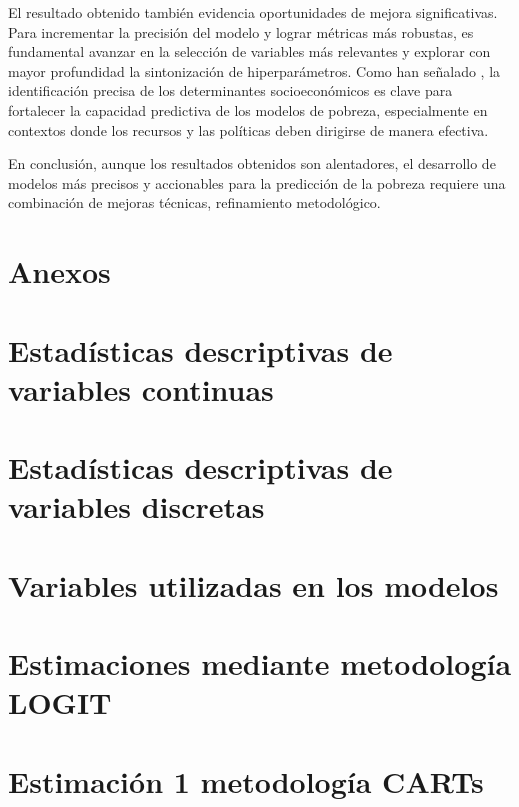 \documentclass[12pt,a4paper,onecolumn]{article}
\begin{document}
El resultado obtenido también evidencia oportunidades de mejora significativas. Para incrementar la precisión del modelo y lograr métricas más robustas, es fundamental avanzar en la selección de variables más relevantes y explorar con mayor profundidad la sintonización de hiperparámetros. Como han señalado \cite{karmaker2025machine}, la identificación precisa de los determinantes socioeconómicos es clave para fortalecer la capacidad predictiva de los modelos de pobreza, especialmente en contextos donde los recursos y las políticas deben dirigirse de manera efectiva.

En conclusión, aunque los resultados obtenidos son alentadores, el desarrollo de modelos más precisos y accionables para la predicción de la pobreza requiere una combinación de mejoras técnicas, refinamiento metodológico.


\clearpage
\appendix
\section*{Anexos}

\section{Estadísticas descriptivas de variables continuas}


\section{Estadísticas descriptivas de variables discretas}


\section{Variables utilizadas en los modelos}


\section{Estimaciones mediante metodología LOGIT}


\section{Estimación 1 metodología CARTs}

\end{document}
